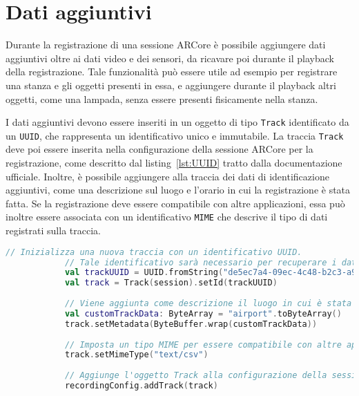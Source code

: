 \documentclass[crop=false, class=book]{standalone}
\begin{document}
	\section{Dati aggiuntivi}
	Durante la registrazione di una sessione ARCore è possibile aggiungere dati aggiuntivi oltre ai dati video e dei sensori, da ricavare poi durante il playback della registrazione. Tale funzionalità può essere utile ad esempio per registrare una stanza e gli oggetti presenti in essa, e aggiungere durante il playback altri oggetti, come una lampada, senza essere presenti fisicamente nella stanza.
	 
	\newpage
	\noindent
	I dati aggiuntivi devono essere inseriti in un oggetto di tipo \verb|Track| identificato da un \verb|UUID|, che rappresenta un identificativo unico e immutabile. La traccia \verb|Track| deve poi essere inserita nella configurazione della sessione ARCore per la registrazione, come descritto dal listing~\vref{lst:UUID} tratto dalla documentazione ufficiale. Inoltre, è possibile aggiungere alla traccia dei dati di identificazione aggiuntivi, come una descrizione sul luogo e l'orario in cui la registrazione è stata fatta. Se la registrazione deve essere compatibile con altre applicazioni, essa può inoltre essere associata con un identificativo \verb|MIME| che descrive il tipo di dati registrati sulla traccia.
	\begin{center}
		\begin{minipage}{0.95\textwidth}
			\begin{lstlisting}[caption={Aggiunta di una traccia alla sessione ARCore.}, label={lst:UUID}, language=Kotlin]
			// Inizializza una nuova traccia con un identificativo UUID.
			// Tale identificativo sarà necessario per recuperare i dati aggiuntivi durante il playback.
			val trackUUID = UUID.fromString("de5ec7a4-09ec-4c48-b2c3-a98b66e71893")
			val track = Track(session).setId(trackUUID)
			
			// Viene aggiunta come descrizione il luogo in cui è stata effettuata.
			val customTrackData: ByteArray = "airport".toByteArray()
			track.setMetadata(ByteBuffer.wrap(customTrackData))
			
			// Imposta un tipo MIME per essere compatibile con altre applicazioni.
			track.setMimeType("text/csv")
			
			// Aggiunge l'oggetto Track alla configurazione della sessione.
			recordingConfig.addTrack(track)  
			
			\end{lstlisting}
		\end{minipage}
	\end{center}
\end{document}
